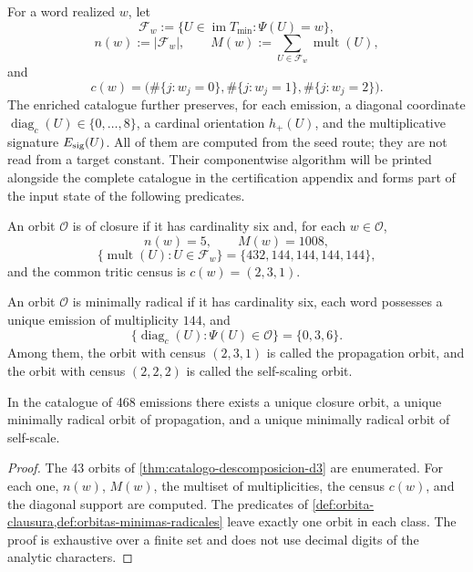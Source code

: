 For a word realized \(w\), let
\[
 \mathcal F_w:=\{U\in\operatorname{im}T_{\min}:\Psi(U)=w\},
\]
\[
 n(w):=|\mathcal F_w|,
 \qquad
 M(w):=\sum_{U\in\mathcal F_w}\operatorname{mult}(U),
\]
and
\[
 c(w)=\bigl(\#\{j:w_j=0\},\#\{j:w_j=1\},\#\{j:w_j=2\}\bigr).
\]
The enriched catalogue further preserves, for each emission, a diagonal
coordinate \(\operatorname{diag}_c(U)\in\{0,\ldots,8\}\), a cardinal
orientation \(h_+(U)\), and the multiplicative signature \(E_{\rm sig}(U)\). All
of them are computed from the seed route; they are not read from a target
constant. Their componentwise algorithm will be printed alongside the complete
catalogue in the certification appendix and forms part of the input state
of the following predicates.

\begin{definition}
\label{def:orbita-clausura}
An orbit \(\mathcal O\) is of closure if it has cardinality six and, for
each \(w\in\mathcal O\),
\[
 n(w)=5,
 \qquad
 M(w)=1008,
\]
\[
 \{\operatorname{mult}(U):U\in\mathcal F_w\}
 =\{432,144,144,144,144\},
\]
and the common tritic census is \(c(w)=(2,3,1)\).
\end{definition}

\begin{definition}
\label{def:orbitas-minimas-radicales}
An orbit \(\mathcal O\) is minimally radical if it has cardinality six, each
word possesses a unique emission of multiplicity \(144\), and
\[
 \{\operatorname{diag}_c(U):\Psi(U)\in\mathcal O\}=\{0,3,6\}.
\]
Among them, the orbit with census \((2,3,1)\) is called the propagation
orbit, and the orbit with census \((2,2,2)\) is called the self-scaling orbit.
\end{definition}

\begin{theorem}
\label{thm:unicidad-tres-orbitas-estructurales}
In the catalogue of 468 emissions there exists a unique closure orbit, a
unique minimally radical orbit of propagation, and a unique minimally radical
orbit of self-scale.
\end{theorem}

\begin{proof}
The 43 orbits of \cref{thm:catalogo-descomposicion-d3} are enumerated. For each one, \(n(w)\), \(M(w)\), the multiset of multiplicities, the census \(c(w)\), and the diagonal support are computed. The predicates of \cref{def:orbita-clausura,def:orbitas-minimas-radicales} leave exactly one orbit in each class. The proof is exhaustive over a finite set and does not use decimal digits of the analytic characters.
\end{proof}

